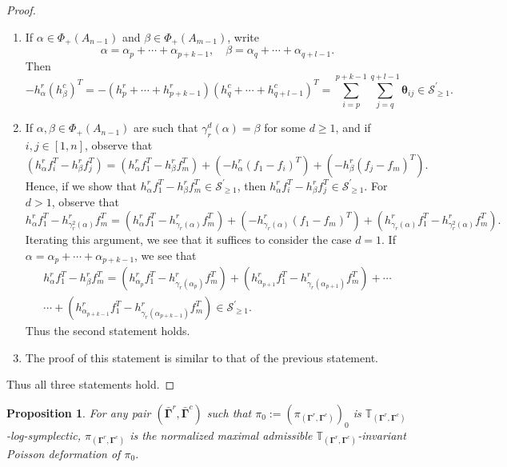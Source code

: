 \documentclass[11pt]{article}
\newcommand{\btheta}{{\boldsymbol{\theta}}}
\newcommand{\bbg}{\bar{\mathbf{\Gamma}}}
\newcommand{\bg}{\mathbf{\Gamma}}
\newtheorem{proposition}[theorem]{Proposition}%
\theoremstyle{definition}\newtheorem{definition}[theorem]{Definition}
\theoremstyle{definition}\newtheorem{remark}[theorem]{Remark}
\theoremstyle{remark}
\numberwithin{equation}{section}
\begin{document}
\begin{proof}
    \begin{enumerate}[1)]
        \item If $\alpha \in \Phi_+(A_{n-1})$ and $\beta \in \Phi_+(A_{m-1})$, write 
        \begin{equation*}
            \alpha = \alpha_p + \cdots + \alpha_{p+k-1}, \quad \beta = \alpha_q + \cdots + \alpha_{q+l-1}.
        \end{equation*}
        Then
        \begin{equation*}
            -h_{\alpha}^r(h^c_{\beta})^T = -(h^r_{p} + \cdots + h^r_{p+k-1})(h_{q}^c + \cdots + h_{q+l-1}^c)^T = \sum_{i=p}^{p+k-1} \sum_{j=q}^{q+l-1} \btheta_{ij} \in \mathcal{S}^\prime_{\geq 1}.
        \end{equation*}
        \item If $\alpha, \beta \in \Phi_+(A_{n-1})$ are such that $\gamma_r^d(\alpha) = \beta$ for some $d \geq 1$, and if $i,j \in [1,n]$, observe that
        \begin{equation*}
            (h_{\alpha}^r f_i^T - h_{\beta}^r f_j^T) = (h_{\alpha}^rf_1^T-h_{\beta}^rf_m^T)+ (-h_{\alpha}^r(f_1-f_i)^T) + (-h_{\beta}^r(f_j-f_m)^T).
        \end{equation*}
        Hence, if we show that $h_{\alpha}^r f_1^T - h_{\beta}^r f_m^T \in \mathcal{S}^\prime_{\geq 1}$, then $h_{\alpha}^r f_i^T - h_{\beta}^r f_j^T \in \mathcal{S}^\prime_{\geq 1}$. For $d > 1$, observe that
        \begin{equation*}
            h_{\alpha}^rf_1^T - h_{\gamma_r^2(\alpha)}^r f_m^T = (h_{\alpha}^r f_1^T-h_{\gamma_r(\alpha)}^r f_m^T) +(-h_{\gamma_r(\alpha)}^r(f_1-f_m)^T) + (h_{\gamma_r(\alpha)}^r f_1^T - h_{\gamma_r^2(\alpha)}^rf_m^T).
        \end{equation*}
        Iterating this argument, we see that it suffices to consider the case $d=1$. If $\alpha = \alpha_p + \cdots +\alpha_{p+k-1}$, we see that
        \begin{equation*}\begin{split}
            h_{\alpha}^r f_1^T - h_{\beta}^r f_m^T = (h_{\alpha_{p}}^r f_1^T - h_{\gamma_r(\alpha_p)}^r f_m^T) + (h_{\alpha_{p+1}}^r f_1^T - h_{\gamma_r(\alpha_{p+1})}^r f_m^T) + \cdots\\ \cdots + (h_{\alpha_{p+k-1}}^r f_1^T - h_{\gamma_r(\alpha_{p+k-1})}^r f_m^T) \in \mathcal{S}^\prime_{\geq 1}.
            \end{split}
        \end{equation*}
        Thus the second statement holds.
        \item The proof of this statement is similar to that of the previous statement.
    \end{enumerate}
    Thus all three statements hold.
\end{proof}
\begin{proposition}
    For any pair $(\bbg^r,\bbg^c)$ such that $\pi_0:=(\pi_{(\bg^r,\bg^c)})_0$ is $\mathbb{T}_{(\bg^r,\bg^c)}$-log-symplectic, $\pi_{(\bg^r,\bg^c)}$ is the normalized maximal admissible $\mathbb{T}_{(\bg^r,\bg^c)}$-invariant Poisson deformation of $\pi_0$.
\end{proposition}
\end{document}
